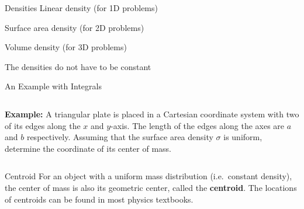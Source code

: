 \documentclass[12pt,compress,aspectratio=169]{beamer}
\begin{document}
\begin{frame}{Densities}
  Linear density (for 1D problems)


  Surface area density (for 2D problems)


  Volume density (for 3D problems)

  
  The densities do not have to be constant
\end{frame}



\begin{frame}{An Example with Integrals}
  \begin{columns}
    \textbf{Example:} A triangular plate is placed in a Cartesian coordinate
    system with two of its edges along the $x$ and $y$-axis. The length of the
    edges along the axes are $a$ and $b$ respectively. Assuming that the
    surface area density $\sigma$ is uniform, determine the coordinate of its
    center of mass.

  \end{columns}
\end{frame}



\begin{frame}{Centroid}
  For an object with a uniform mass distribution (i.e.\ constant density), the
  center of mass is also its geometric center, called the \textbf{centroid}.
  The locations of centroids can be found in most physics textbooks.
  \begin{center}
  \end{center}
\end{frame}
\end{document}
